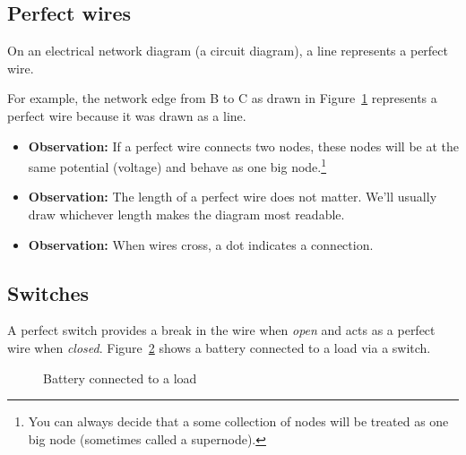 \subsection{Perfect wires}
On an electrical network diagram (a circuit diagram), a line represents a perfect wire.

\begin{figure}[H]
\begin{center}
\label{F:2BL}
\end{center}
\end{figure}

For example, the network edge from B to C as drawn in Figure~\ref{F:2BL} represents a perfect wire because it was drawn as a line.
\par
\noindent
\begin{itemize}
\item \textbf{Observation:} If a perfect wire connects two nodes, these nodes will be at the same potential (voltage) and behave as one big node.\footnote{You can always decide that a some collection of nodes will be treated as one big node (sometimes called a supernode).} 
\item \textbf{Observation:} The length of a perfect wire does not matter. We'll usually draw whichever length makes the diagram most readable.
\item \textbf{Observation:} When wires cross, a dot indicates a connection.
\end{itemize}
\subsection{Switches}
A perfect switch provides a break in the wire when \emph{open} and acts as a perfect wire when \emph{closed}. Figure~\ref{F:2BLa} shows a battery connected to a load via a switch.

\begin{figure}[H]
\begin{center}
\caption{Battery connected to a load}
\label{F:2BLa}
\end{center}
\end{figure}

